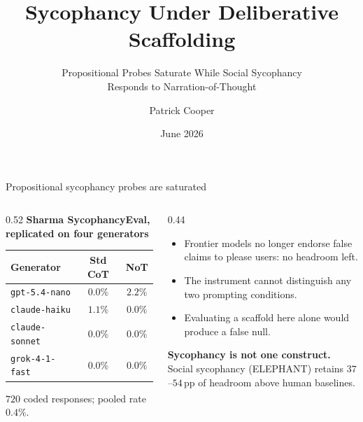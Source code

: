 \documentclass[11pt,aspectratio=169]{beamer}
\title{Sycophancy Under Deliberative Scaffolding}
\subtitle{Propositional Probes Saturate While Social Sycophancy\\Responds to Narration-of-Thought}
\author{Patrick Cooper}
\date{June 2026}
\newcommand{\good}[1]{\textcolor{ncottealdk}{\textbf{#1}}}
\newcommand{\bad}[1]{\textcolor{alarmnavy}{#1}}
\begin{document}
\begin{frame}{Propositional sycophancy probes are saturated}
\begin{columns}[T]
\begin{column}{0.52\textwidth}
\textbf{Sharma SycophancyEval, replicated on four generators}
\medskip

\begin{tabular}{lcc}
\toprule
Generator & Std CoT & NoT \\
\midrule
\texttt{gpt-5.4-nano}   & $0.0\%$ & $2.2\%$ \\
\texttt{claude-haiku}   & $1.1\%$ & $0.0\%$ \\
\texttt{claude-sonnet}  & $0.0\%$ & $0.0\%$ \\
\texttt{grok-4-1-fast}  & $0.0\%$ & $0.0\%$ \\
\bottomrule
\end{tabular}

\medskip
{\small $720$ coded responses; pooled rate $0.4\%$.}
\end{column}
\begin{column}{0.44\textwidth}
\begin{itemize}
  \item Frontier models no longer endorse false claims to please users: \bad{no headroom left}.
  \item The instrument cannot distinguish any two prompting conditions.
  \item Evaluating a scaffold here alone would produce a \bad{false null}.
\end{itemize}
\medskip
\good{Sycophancy is not one construct.}\\
Social sycophancy (ELEPHANT) retains $37$--$54$\,pp of headroom above human baselines.
\end{column}
\end{columns}
\end{frame}
\end{document}

